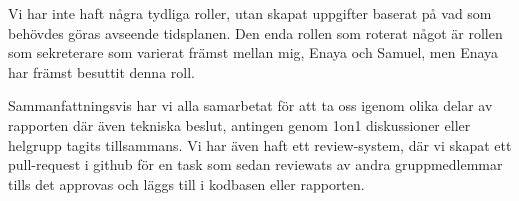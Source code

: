 Vi har inte haft några tydliga roller, utan skapat uppgifter baserat på vad som
behövdes göras avseende tidsplanen. Den enda rollen som roterat något är rollen
som sekreterare som varierat främst mellan mig, Enaya och Samuel, men Enaya har främst
besuttit denna roll.

Sammanfattningsvis har vi alla samarbetat för att ta oss igenom olika delar av
rapporten där även tekniska beslut, antingen genom 1on1 diskussioner eller
helgrupp tagits tillsammans. Vi har även haft ett review-system, där vi skapat
ett pull-request i github för en task som sedan reviewats av andra
gruppmedlemmar tills det approvas och läggs till i kodbasen eller rapporten.



